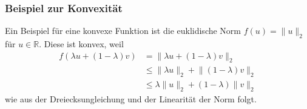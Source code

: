 \subsubsection{Beispiel zur Konvexität}
Ein Beispiel für eine konvexe Funktion ist die euklidische Norm $f(u) = \lVert u\rVert_2$ für $u\in\mathbb{R}$. Diese ist konvex, weil
\begin{align*}
f(\lambda u+(1-\lambda)v) &=\lVert\lambda u+(1-\lambda)v\rVert_2\\
&\leq\lVert\lambda u\rVert_2+\lVert(1-\lambda)v\rVert_2\\
&\leq\lambda\lVert u\rVert_2+(1-\lambda)\lVert v\rVert_2
\end{align*}
wie aus der Dreiecksungleichung und der Linearität der Norm folgt.
